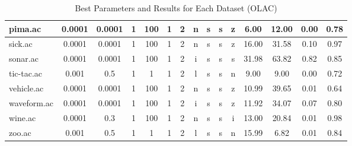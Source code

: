 \begin{table}[htbp]
{\begin{tabular}{|l|c|c|c|c|c|c|c|c|c|c||c|c|c|c|}
		\hline
		pima.ac        & 0.0001   & 0.0001      & 1              & 100                 & 1             & 2        & n             & s      & s        & z        & 6.00           & 12.00          & 0.00           & 0.78           \\
		\hline
		sick.ac        & 0.0001   & 0.0001      & 1              & 100                 & 1             & 2        & n             & s      & s        & z        & 16.00          & 31.58          & 0.10           & 0.97           \\
		\hline
		sonar.ac       & 0.0001   & 0.0001      & 1              & 100                 & 1             & 2        & i             & s      & s        & s        & 31.98          & 63.82          & 0.82           & 0.85           \\
		\hline
		tic-tac.ac     & 0.001    & 0.5         & 1              & 1                   & 1             & 2        & l             & s      & s        & n        & 9.00           & 9.00           & 0.00           & 0.72           \\
		\hline
		vehicle.ac     & 0.0001   & 0.0001      & 1              & 100                 & 1             & 2        & n             & s      & s        & z        & 10.99          & 39.65          & 0.01           & 0.64           \\
		\hline
		waveform.ac    & 0.0001   & 0.0001      & 1              & 100                 & 1             & 2        & i             & s      & s        & z        & 11.92          & 34.07          & 0.07           & 0.80           \\
		\hline
		wine.ac        & 0.0001   & 0.3         & 1              & 100                 & 1             & 2        & n             & s      & s        & i        & 13.00          & 20.84          & 0.01           & 0.98           \\
		\hline
		zoo.ac         & 0.001    & 0.5         & 1              & 1                   & 1             & 2        & l             & s      & s        & n        & 15.99          & 6.82           & 0.01           & 0.84           \\
		\hline
		\end{tabular}
		}
	\caption{Best Parameters and Results for Each Dataset (OLAC)}
	\label{tab:best_runs_for_each_db_olac}
\end{table}
